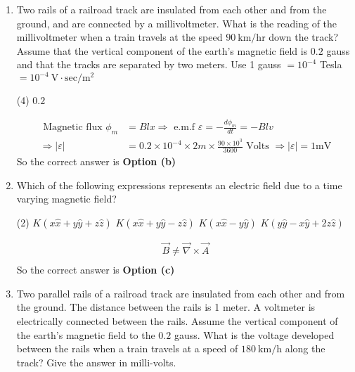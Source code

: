 \begin{enumerate}
	\item Two rails of a railroad track are insulated from each other and from the ground, and are connected by a millivoltmeter. What is the reading of the millivoltmeter when a train travels at the speed $90 \mathrm{~km} / \mathrm{hr}$ down the track? Assume that the vertical component of the earth's magnetic field is $0.2$ gauss and that the tracks are separated by two meters. Use 1 gauss $=10^{-4}$ Tesla $=10^{-4} \mathrm{~V} \cdot \mathrm{sec} / \mathrm{m}^{2}$
	{}
	\begin{tasks}(4)
		\task[\textbf{c.}]$0.2$
	\end{tasks}
\begin{answer}
	\begin{align*}
	\text { Magnetic flux } \phi_{m}&=B l x \Rightarrow \text { e.m.f } \varepsilon=-\frac{d \phi_{m}}{d t}=-B l v\\
	\Rightarrow|\varepsilon|&=0.2 \times 10^{-4} \times 2 m \times \frac{90 \times 10^{3}}{3600} \text { Volts } \Rightarrow|\varepsilon|=1 \mathrm{mV}
	\end{align*}
		So the correct answer is \textbf{Option (b)}
\end{answer}
	\item 	Which of the following expressions represents an electric field due to a time varying magnetic field?
	{}
	\begin{tasks}(2)
		\task[\textbf{a.}]$K(x \hat{x}+y \hat{y}+z \hat{z})$
		\task[\textbf{b.}] $K(x \hat{x}+y \hat{y}-z \hat{z})$
		\task[\textbf{c.}]$K(x \hat{x}-y \hat{y})$
		\task[\textbf{d.}]$K(y \hat{y}-x \hat{y}+2 z \hat{z})$ 
	\end{tasks}	
\begin{answer}
	\begin{align*}
	\vec{B} \neq \vec{\nabla} \times \vec{A}\\
	\end{align*}
	So the correct answer is \textbf{Option (c)}
\end{answer}
	\item Two parallel rails of a railroad track are insulated from each other and from the ground. The distance between the rails is 1 meter. A voltmeter is electrically connected between the rails. Assume the vertical component of the earth's magnetic field to the $0.2$ gauss. What is the voltage developed between the rails when a train travels at a speed of $180 \mathrm{~km} / \mathrm{h}$ along the track? Give the answer in milli-volts.

\end{enumerate}
